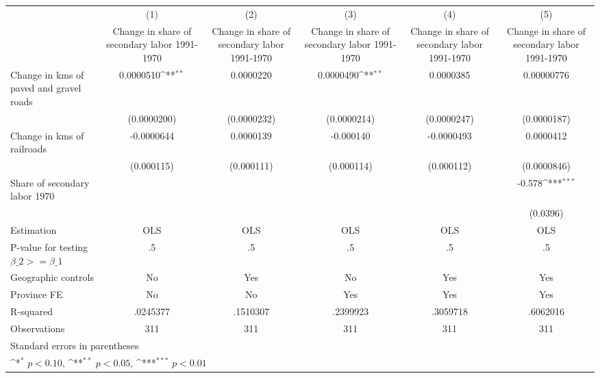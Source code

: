 {
\def\sym#1{\ifmmode^{#1}\else\(^{#1}\)\fi}
\begin{tabular}{l*{5}{c}}
\hline\hline
                    &\multicolumn{1}{c}{(1)}&\multicolumn{1}{c}{(2)}&\multicolumn{1}{c}{(3)}&\multicolumn{1}{c}{(4)}&\multicolumn{1}{c}{(5)}\\
                    &\multicolumn{1}{c}{Change in share of secondary labor 1991-1970}&\multicolumn{1}{c}{Change in share of secondary labor 1991-1970}&\multicolumn{1}{c}{Change in share of secondary labor 1991-1970}&\multicolumn{1}{c}{Change in share of secondary labor 1991-1970}&\multicolumn{1}{c}{Change in share of secondary labor 1991-1970}\\
\hline
Change in kms of paved and gravel roads&   0.0000510\sym{**} &   0.0000220         &   0.0000490\sym{**} &   0.0000385         &  0.00000776         \\
                    & (0.0000200)         & (0.0000232)         & (0.0000214)         & (0.0000247)         & (0.0000187)         \\
[1em]
Change in kms of railroads&  -0.0000644         &   0.0000139         &   -0.000140         &  -0.0000493         &   0.0000412         \\
                    &  (0.000115)         &  (0.000111)         &  (0.000114)         &  (0.000112)         & (0.0000846)         \\
[1em]
Share of secondary labor 1970&                     &                     &                     &                     &      -0.578\sym{***}\\
                    &                     &                     &                     &                     &    (0.0396)         \\
\hline
Estimation          &         OLS         &         OLS         &         OLS         &         OLS         &         OLS         \\
P-value for testing $\beta\_2 >= \beta\_1$&          .5         &          .5         &          .5         &          .5         &          .5         \\
Geographic controls &          No         &         Yes         &          No         &         Yes         &         Yes         \\
Province FE         &          No         &          No         &         Yes         &         Yes         &         Yes         \\
R-squared           &    .0245377         &    .1510307         &    .2399923         &    .3059718         &    .6062016         \\
Observations        &         311         &         311         &         311         &         311         &         311         \\
\hline\hline
\multicolumn{6}{l}{\footnotesize Standard errors in parentheses}\\
\multicolumn{6}{l}{\footnotesize \sym{*} \(p<0.10\), \sym{**} \(p<0.05\), \sym{***} \(p<0.01\)}\\
\end{tabular}
}
